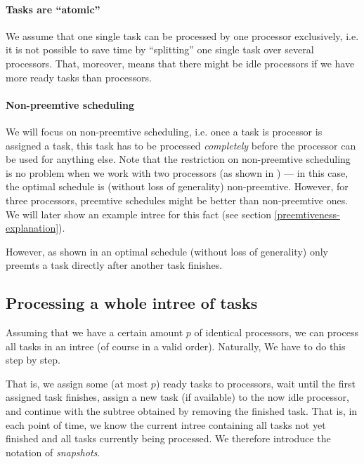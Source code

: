 \paragraph{Tasks are ``atomic''}

We assume that one single task can be processed by one processor exclusively, i.e. it is not possible to save time by ``splitting'' one single task over several processors. That, moreover, means that there might be idle processors if we have more ready tasks than processors.

\paragraph{Non-preemtive scheduling}

We will focus on non-preemtive scheduling, i.e. once a task is processor is assigned a task, this task has to be processed \emph{completely} before the processor can be used for anything else. Note that the restriction on non-preemtive scheduling is no problem when we work with two processors (as shown in \cite{chandyreynoldslargepaper1979}) --- in this case, the optimal schedule is (without loss of generality) non-preemtive. However, for three processors, preemtive schedules might be better than non-preemtive ones. We will later show an example intree for this fact (see section \ref{preemtiveness-explanation}).

However, as shown in \cite{chandyreynoldslargepaper1979} an optimal schedule (without loss of generality) only preemts a task directly after another task finishes.

\subsection{Processing a whole intree of tasks}
\label{sec:processing-an-intree-of-tasks}

Assuming that we have a certain amount $p$ of identical processors, we can process all tasks in an intree (of course in a valid order). Naturally, We have to do this step by step. 

That is, we assign some (at most $p$) ready tasks to processors, wait until the first assigned task finishes, assign a new task (if available) to the now idle processor, and continue with the subtree obtained by removing the finished task. That is, in each point of time, we know the current intree containing all tasks not yet finished and all tasks currently being processed. We therefore introduce the notation of \emph{snapshots}.

